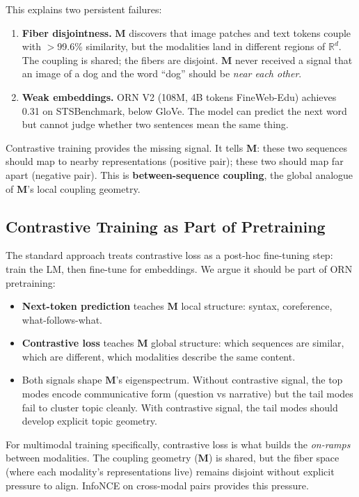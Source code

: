 \documentclass[11pt, a4paper]{article}
\newcommand{\M}{\mathbf{M}}
\newcommand{\R}{\mathbb{R}}
\theoremstyle{plain}
\theoremstyle{remark}
\begin{document}
This explains two persistent failures:
\begin{enumerate}[nosep]
    \item \textbf{Fiber disjointness.} $\M$ discovers that image patches and text tokens couple with $>$99.6\% similarity, but the modalities land in different regions of $\R^d$.
    The coupling is shared; the fibers are disjoint.
    $\M$ never received a signal that an image of a dog and the word ``dog'' should be \emph{near each other}.
    \item \textbf{Weak embeddings.} ORN V2 (108M, 4B tokens FineWeb-Edu) achieves 0.31 on STSBenchmark, below GloVe.
    The model can predict the next word but cannot judge whether two sentences mean the same thing.
\end{enumerate}

Contrastive training provides the missing signal.
It tells $\M$: these two sequences should map to nearby representations (positive pair); these two should map far apart (negative pair).
This is \textbf{between-sequence coupling}, the global analogue of $\M$'s local coupling geometry.

\subsection{Contrastive Training as Part of Pretraining}

The standard approach treats contrastive loss as a post-hoc fine-tuning step: train the LM, then fine-tune for embeddings.
We argue it should be part of ORN pretraining:

\begin{itemize}[nosep]
    \item \textbf{Next-token prediction} teaches $\M$ local structure: syntax, coreference, what-follows-what.
    \item \textbf{Contrastive loss} teaches $\M$ global structure: which sequences are similar, which are different, which modalities describe the same content.
    \item Both signals shape $\M$'s eigenspectrum. Without contrastive signal, the top modes encode communicative form (question vs narrative) but the tail modes fail to cluster topic cleanly. With contrastive signal, the tail modes should develop explicit topic geometry.
\end{itemize}

For multimodal training specifically, contrastive loss is what builds the \emph{on-ramps} between modalities.
The coupling geometry ($\M$) is shared, but the fiber space (where each modality's representations live) remains disjoint without explicit pressure to align.
InfoNCE on cross-modal pairs provides this pressure.
\end{document}
